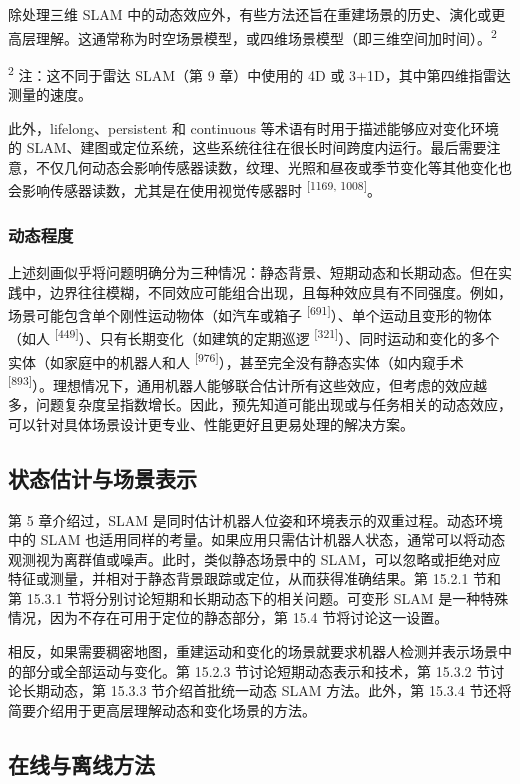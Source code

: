 除处理三维 SLAM 中的动态效应外，有些方法还旨在重建场景的历史、演化或更高层理解。这通常称为时空场景模型，或四维场景模型（即三维空间加时间）。\textsuperscript{2}

\textsuperscript{2} 注：这不同于雷达 SLAM（第 9 章）中使用的 4D 或 3+1D，其中第四维指雷达测量的速度。

此外，lifelong、persistent 和 continuous 等术语有时用于描述能够应对变化环境的 SLAM、建图或定位系统，这些系统往往在很长时间跨度内运行。最后需要注意，不仅几何动态会影响传感器读数，纹理、光照和昼夜或季节变化等其他变化也会影响传感器读数，尤其是在使用视觉传感器时 \textsuperscript{[1169, 1008]}。

\subsubsection{动态程度}

上述刻画似乎将问题明确分为三种情况：静态背景、短期动态和长期动态。但在实践中，边界往往模糊，不同效应可能组合出现，且每种效应具有不同强度。例如，场景可能包含单个刚性运动物体（如汽车或箱子 \textsuperscript{[691]}）、单个运动且变形的物体（如人 \textsuperscript{[449]}）、只有长期变化（如建筑的定期巡逻 \textsuperscript{[321]}）、同时运动和变化的多个实体（如家庭中的机器人和人 \textsuperscript{[976]}），甚至完全没有静态实体（如内窥手术 \textsuperscript{[893]}）。理想情况下，通用机器人能够联合估计所有这些效应，但考虑的效应越多，问题复杂度呈指数增长。因此，预先知道可能出现或与任务相关的动态效应，可以针对具体场景设计更专业、性能更好且更易处理的解决方案。

\subsection{状态估计与场景表示}

第 5 章介绍过，SLAM 是同时估计机器人位姿和环境表示的双重过程。动态环境中的 SLAM 也适用同样的考量。如果应用只需估计机器人状态，通常可以将动态观测视为离群值或噪声。此时，类似静态场景中的 SLAM，可以忽略或拒绝对应特征或测量，并相对于静态背景跟踪或定位，从而获得准确结果。第 15.2.1 节和第 15.3.1 节将分别讨论短期和长期动态下的相关问题。可变形 SLAM 是一种特殊情况，因为不存在可用于定位的静态部分，第 15.4 节将讨论这一设置。

相反，如果需要稠密地图，重建运动和变化的场景就要求机器人检测并表示场景中的部分或全部运动与变化。第 15.2.3 节讨论短期动态表示和技术，第 15.3.2 节讨论长期动态，第 15.3.3 节介绍首批统一动态 SLAM 方法。此外，第 15.3.4 节还将简要介绍用于更高层理解动态和变化场景的方法。

\subsection{在线与离线方法}

